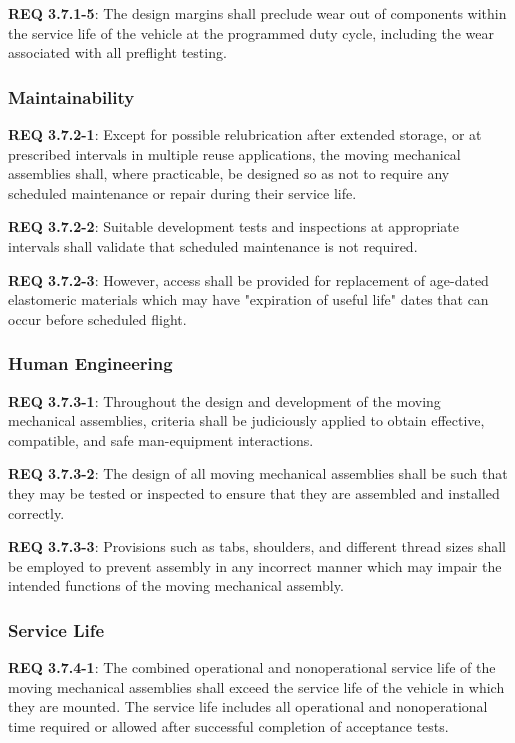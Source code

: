 \documentclass[12pt]{article}
\begin{document}
\noindent \textbf{REQ 3.7.1-5}: The design margins shall preclude wear out of components within the service life of the vehicle at the programmed duty cycle, including the wear associated with all preflight testing.


\subsubsection{Maintainability} %
\noindent \textbf{REQ 3.7.2-1}: Except for possible relubrication after extended storage, or at prescribed intervals in multiple reuse applications, the moving mechanical assemblies shall, where practicable, be designed so as not to require any scheduled maintenance or repair during their service life.

\noindent \textbf{REQ 3.7.2-2}: Suitable development tests and inspections at appropriate intervals shall validate that scheduled maintenance is not required. 

\noindent \textbf{REQ 3.7.2-3}: However, access shall be provided for replacement of age-dated elastomeric materials which may have "expiration of useful life" dates that can occur before scheduled flight.


\subsubsection{Human Engineering} %
\noindent \textbf{REQ 3.7.3-1}: Throughout the design and development of the moving mechanical assemblies, criteria shall be judiciously applied to obtain effective, compatible, and safe man-equipment interactions. 

\noindent \textbf{REQ 3.7.3-2}: The design of all moving mechanical assemblies shall be such that they may be tested or inspected to ensure that they are assembled and installed correctly.

\noindent \textbf{REQ 3.7.3-3}: Provisions such as tabs, shoulders, and different thread sizes shall be employed to prevent assembly in any incorrect manner which may impair the intended functions of the moving mechanical assembly.


\subsubsection{Service Life} %
\noindent \textbf{REQ 3.7.4-1}: The combined operational and nonoperational service life of the moving mechanical assemblies shall exceed the service life of the vehicle in which they are mounted. 
The service life includes all operational and nonoperational time required or allowed after successful completion of acceptance tests.
\end{document}
